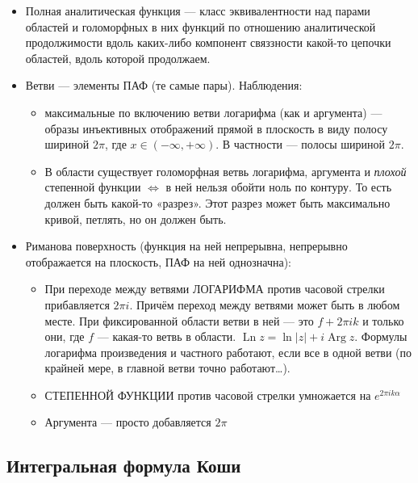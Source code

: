 \documentclass[12pt, a4paper]{article}
\begin{document}
\begin{itemize}
  \item Полная аналитическая функция — класс эквивалентности над парами областей и голоморфных в них функций по отношению аналитической продолжимости 
  вдоль каких-либо компонент связзности какой-то цепочки областей, вдоль которой продолжаем.
  \item Ветви — элементы ПАФ (те самые пары). Наблюдения:
  \begin{itemize}
    \item максимальные по включению ветви логарифма (как и аргумента) — образы инъективных отображений прямой в плоскость в виду полосу шириной $2 \pi$, где $x \in (-∞, +∞)$. В частности — полосы шириной $2 \pi$.
    \item В области существует голоморфная ветвь логарифма, аргумента и \textit{плохой} степенной функции $\Leftrightarrow$ в ней нельзя обойти ноль по контуру. То есть должен быть какой-то «разрез». Этот разрез может быть максимально кривой, петлять, но он должен быть.
  \end{itemize}
  \item Риманова поверхность (функция на ней непрерывна, непрерывно отображается на плоскость, ПАФ на ней однозначна):
  \begin{itemize}
    \item При переходе между ветвями ЛОГАРИФМА против часовой стрелки прибавляется $2\pi i$. Причём переход между ветвями может быть в любом месте. При фиксированной области ветви в ней — это $f + 2\pi i k$ и только они, где $f$ — какая-то ветвь в области. $\operatorname{Ln} z = \ln |z| + i\operatorname{Arg} z$.
    Формулы логарифма произведения и частного работают, если все в одной ветви (по крайней мере, в главной ветви точно работают…).
    \item \ditto СТЕПЕННОЙ ФУНКЦИИ против часовой стрелки умножается на $e^{2 \pi i k \alpha}$
    \item \ditto Аргумента — просто добавляется $2\pi$
  \end{itemize}
\end{itemize}




\subsection{Интегральная формула Коши}
\end{document}
